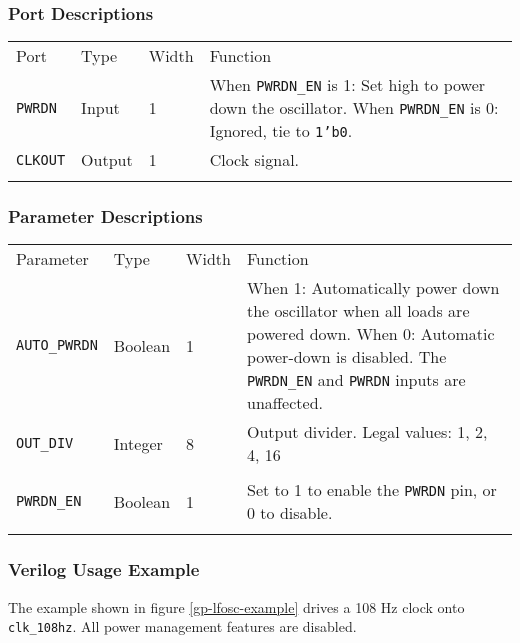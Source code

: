\documentclass[11pt]{article}
\newcommand{\tokenstyle}[1]{\texttt{#1}}
\newcommand{\wirestyle}[1]{\texttt{#1}}
\newcommand{\datastyle}[1]{\texttt{#1}}
\newcommand{\whenstyle}[1]{{\fontseries{sb}\selectfont#1}}
\newcommand{\thinhline}{\Xhline{1\arrayrulewidth}}
\newcommand{\thickhline}{\Xhline{2.5\arrayrulewidth}}
\begin{document}
\subsubsection{Port Descriptions}

\begin{tabularx}{\textwidth}{lllX}
\thinhline
\whenstyle{Port} & \whenstyle{Type} & \whenstyle{Width} & \whenstyle{Function} \\
\thickhline
\tokenstyle{PWRDN} & Input & 1 &
	\whenstyle{When \tokenstyle{PWRDN\_EN} is 1:} Set high to power down the oscillator. \newline
	\whenstyle{When \tokenstyle{PWRDN\_EN} is 0:} Ignored, tie to \datastyle{1'b0}.\\
\thinhline
\tokenstyle{CLKOUT} & Output & 1 & Clock signal. \\
\thinhline
\end{tabularx}

\subsubsection{Parameter Descriptions}

\begin{tabularx}{\textwidth}{lllX}
\thinhline
\whenstyle{Parameter} & \whenstyle{Type} & \whenstyle{Width} & \whenstyle{Function} \\
\thickhline
\tokenstyle{AUTO\_PWRDN} & Boolean & 1 &
	\whenstyle{When 1:} Automatically power down the oscillator when all loads are powered down. \newline
	\whenstyle{When 0:} Automatic power-down is disabled. The \tokenstyle{PWRDN\_EN} and \tokenstyle{PWRDN} inputs are unaffected.\\
\thinhline
\tokenstyle{OUT\_DIV} & Integer & 8 &
	Output divider. Legal values: 1, 2, 4, 16 \\
\\
\thinhline
\tokenstyle{PWRDN\_EN} & Boolean & 1 & Set to 1 to enable the \tokenstyle{PWRDN} pin, or 0 to disable. \\
\thinhline
\end{tabularx}

\subsubsection{Verilog Usage Example}

The example shown in figure \ref{gp-lfosc-example} drives a 108 Hz clock onto \wirestyle{clk\_108hz}. All power management features
are disabled.
\end{document}

